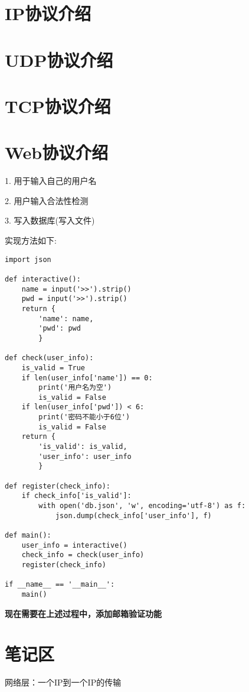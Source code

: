 \documentclass[cn,chinese,color=cyan]{elegantbook}
\begin{document}
\section{IP协议介绍}


\section{UDP协议介绍}


\section{TCP协议介绍}


\section{Web协议介绍}
\begin{warning}[title={{\color{green} \faEnvira} 完成一个用户输入注册：\ }]
1. 用于输入自己的用户名

2. 用户输入合法性检测

3. 写入数据库(写入文件)
\end{warning}
实现方法如下:
\begin{code}
	\vspace{-10pt}
	\begin{lstlisting}[style=Python2]
import json

def interactive():
	name = input('>>').strip()
	pwd = input('>>').strip()
	return {
		'name': name,
		'pwd': pwd
		}

def check(user_info):
	is_valid = True
	if len(user_info['name']) == 0:
		print('用户名为空')
		is_valid = False
	if len(user_info['pwd']) < 6:
		print('密码不能小于6位')
		is_valid = False
	return {
		'is_valid': is_valid,
		'user_info': user_info
		}

def register(check_info):
	if check_info['is_valid']:
		with open('db.json', 'w', encoding='utf-8') as f:
			json.dump(check_info['user_info'], f)

def main():
	user_info = interactive()
	check_info = check(user_info)
	register(check_info)

if __name__ == '__main__':
	main()
	\end{lstlisting}
	\vspace{-10pt}
\end{code}

\textbf{现在需要在上述过程中，添加邮箱验证功能}


\section{笔记区}
网络层：一个IP到一个IP的传输
\end{document}

